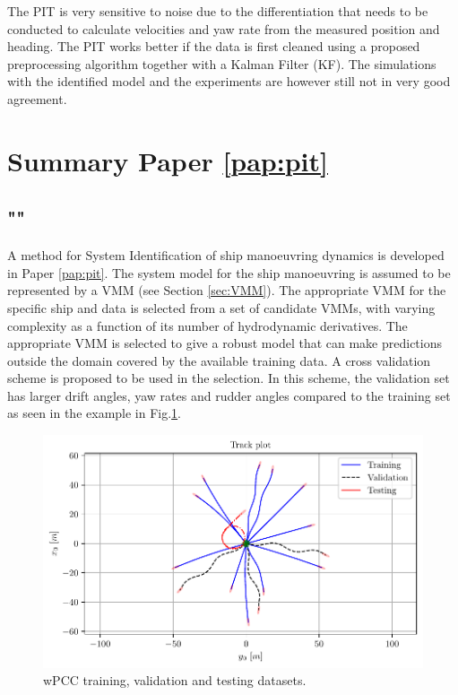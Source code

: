 \noindent The PIT is very sensitive to noise due to the differentiation that needs to be conducted to calculate velocities and yaw rate from the measured position and heading. The PIT works better if the data is first cleaned using a proposed preprocessing algorithm together with a Kalman Filter (KF). The simulations with the identified model and the experiments are however still not in very good agreement.     

\section{Summary Paper \ref{pap:pit}}
\subsection*{""}
A method for System Identification of ship manoeuvring dynamics is developed in Paper \ref{pap:pit}. The system model for the ship manoeuvring is assumed to be represented by a VMM (see Section \ref{sec:VMM}). The appropriate VMM for the specific ship and data is selected from a set of candidate VMMs, with varying complexity as a function of its number of hydrodynamic derivatives. The appropriate VMM is selected to give a robust model that can make predictions outside the domain covered by the available training data. A cross validation scheme is proposed to be used in the selection. In this scheme, the validation set has larger drift angles, yaw rates and rudder angles compared to the training set as seen in the example in Fig.\ref{fig:cross_validation}.
\begin{figure}[H]
    \centering
    \includegraphics[width=\linewidth]{kappa/images/3.pdf}
    \caption{wPCC training, validation and testing datasets.}
    \label{fig:cross_validation}
\end{figure}
